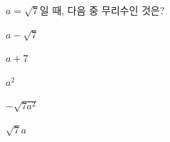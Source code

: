$a=\sqrt{7}$일 때, 다음 중 무리수인 것은?
\begin{choices32}{\rule[-3ex]{0pt}{8ex}$a-\sqrt{7}$}{\rule[-3ex]{0pt}{8ex}$a+7$}{\rule[-3ex]{0pt}{8ex}$a^2$}{\rule[-3ex]{0pt}{8ex}$-\sqrt{7a^2}$}{\rule[-3ex]{0pt}{8ex}$\sqrt{7}a$}\end{choices32}

